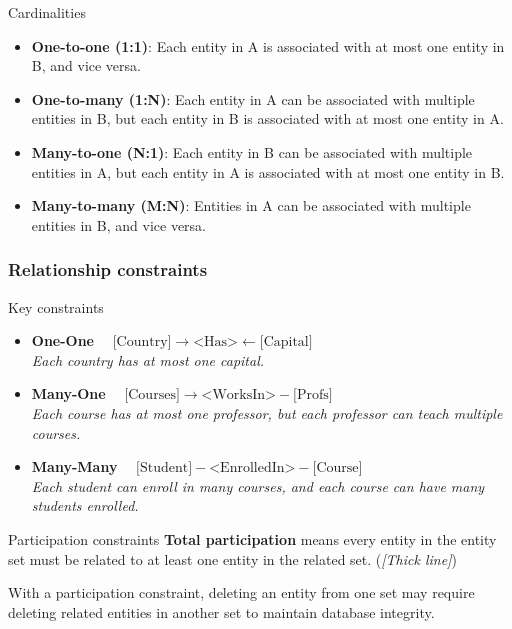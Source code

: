\begin{knBox}
    {Cardinalities}
    \begin{itemize}
        \item \textbf{One-to-one (1:1)}: Each entity in A is associated with at most one entity in B, and vice versa.
        \item \textbf{One-to-many (1:N)}: Each entity in A can be associated with multiple entities in B, but each entity in B is associated with at most one entity in A.
        \item \textbf{Many-to-one (N:1)}: Each entity in B can be associated with multiple entities in A, but each entity in A is associated with at most one entity in B.
        \item \textbf{Many-to-many (M:N)}: Entities in A can be associated with multiple entities in B, and vice versa.
    \end{itemize}
\end{knBox}

\subsubsection{Relationship constraints}
\label{sec:constraints}

\begin{definition}
    {Key constraints}
    \begin{itemize}
        \item \textbf{One-One} $\quad\text{[Country]} \rightarrow \text{<Has>} \leftarrow \text{[Capital]}$\\ \textit{Each country has at most one capital.}
        \item \textbf{Many-One} $\quad\text{[Courses]} \rightarrow \text{<WorksIn>} - \text{[Profs]}$\\ \textit{Each course has at most one professor, but each professor can teach multiple courses.}
        \item \textbf{Many-Many} $\quad\text{[Student]} - \text{<EnrolledIn>} - \text{[Course]}$\\ \textit{Each student can enroll in many courses, and each course can have many students enrolled.}
    \end{itemize}
\end{definition}

\begin{definition}
    {Participation constraints}
    \textbf{Total participation} means every entity in the entity set must be related to at least one entity in the related set. (\textit{[Thick line]})

    With a participation constraint, deleting an entity from one set may require deleting related entities in another set to maintain database integrity.
\end{definition}

